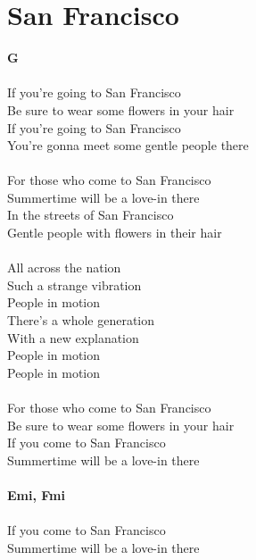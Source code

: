 \section{San Francisco}
\footnotesize\textbf{G}\\
\\
\normalsize
{}If you're going to San Francisco\\
Be sure to wear some flowers in your hair\\
If you're going to San Francisco\\
You're gonna meet some gentle people there\\
\\
For those who come to San Francisco\\
Summertime will be a love-in there\\
In the streets of San Francisco\\
Gentle people with flowers in their hair\\
\\
All across the nation\\
Such a strange vibration\\
People in motion\\
There's a whole generation\\
With a new explanation\\
People in motion\\
People in motion\\
\\
For those who come to San Francisco\\
Be sure to wear some flowers in your hair\\
If you come to San Francisco\\
Summertime will be a love-in there\\
\\
\footnotesize\textbf{Emi, F\kr mi}\\
\\
\normalsize
If you come to San Francisco\\
Summertime will be a love-in there\\
